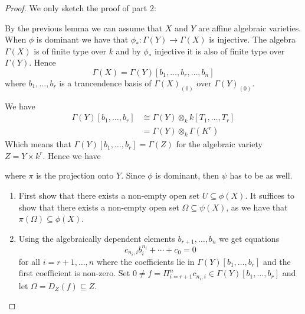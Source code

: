\begin{proof}
We only sketch the proof of part 2:

By the previous lemma we can assume that $X$ and $Y$ are affine algebraic varieties. When $\phi$ is dominant we have that $\phi_*\colon \Gamma(Y)\longrightarrow \Gamma(X)$ is injective. The algebra $\Gamma(X)$ is of finite type over $k$ and by $\phi_*$ injective it is also of finite type over $\Gamma(Y)$. Hence
\begin{equation*}
    \Gamma(X) = \Gamma(Y)[b_1, \ldots, b_r, \ldots, b_n]
\end{equation*}
where $b_1, \ldots, b_r$ is a trancendence basis of $\Gamma(X)_{(0)}$ over $\Gamma(Y)_{(0)}$. 

We have 
\begin{align*}
    \Gamma(Y)[b_1, \ldots, b_r] 
    &\cong \Gamma(Y)\otimes_k k[T_1, \ldots, T_r] \\
    &=\Gamma(Y)\otimes_k\Gamma(K^r)
\end{align*}
Which means that $\Gamma(Y)[b_1, \ldots, b_r] = \Gamma(Z)$ for the algebraic variety $Z = Y\times k^r$. Hence we have 
\begin{center}
\end{center}
where $\pi$ is the projection onto $Y$. Since $\phi$ is dominant, then $\psi$ has to be as well. 
\begin{enumerate}
    \item First show that there exists a non-empty open set $U\subseteq \phi(X)$. It suffices to show that there exists a non-empty open set $\Omega \subseteq \psi(X)$, as we have that $\pi(\Omega)\subseteq \phi(X)$. 
    \item Using the algebraically dependent elements $b_{r+1},\ldots, b_n$ we get equations 
    \begin{equation*}
        c_{n_i, i}b_i^{n_i}+\cdots + c_0 = 0
    \end{equation*}
    for all $i = r+1, \ldots, n$ where the coefficients lie in $\Gamma(Y)[b_1, \ldots, b_r]$ and the first coefficient is non-zero. Set $0\neq f = \Pi_{i=r+1}^n c_{n_i, i} \in \Gamma(Y)[b_1, \ldots, b_r]$ and let $\Omega = D_Z(f)\subseteq Z$. 
\end{enumerate}


\end{proof}
